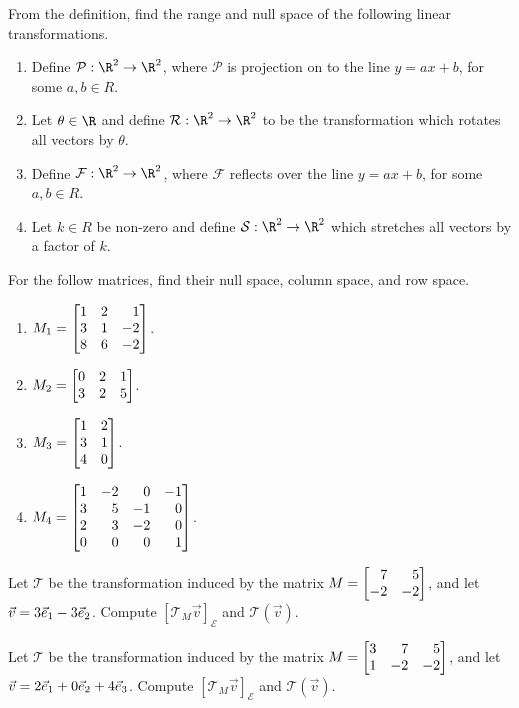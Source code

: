 \begin{exercises}
	\begin{problist}
		\prob  From the definition, find the range and null space of the following linear transformations.
		\begin{enumerate}
		    \item   Define $\mathcal P:\R^2\to\R^2$, where $\mathcal P$ is projection on to the line $y=ax+b$, for some $a,b \in R$.
			\item   Let $\theta\in \R$ and define $\mathcal R:\R^2\to\R^2$ to be the transformation which rotates all vectors by $\theta$.
			\item   Define $\mathcal F:\R^2\to\R^2$, where $\mathcal F$ reflects over the line $y=ax+b$, for some $a,b \in R$.
			\item   Let $k\in R$ be non-zero and define $\mathcal S:\R^2\to\R^2$ which stretches all vectors by a factor of $k$.
		\end{enumerate}
		
		\prob For the follow matrices, find their null space, column space, and row space.
		    \begin{enumerate}
		        \item $M_1=\mat{1&2&1\\3&1&-2\\8&6&-2}$.
		        \item $M_2=\mat{0&2&1\\3&2&5}$.
		        \item $M_3=\mat{1&2\\3&1\\4&0}$.
		        \item $M_4=\mat{1&-2&0&-1\\3&5&-1&0\\2&3&-2&0\\0&0&0&1}$.
		    \end{enumerate}
		    
		\prob Let $\mathcal T$ be the transformation induced by the matrix $M=\mat{7&5\\-2&-2}$,
	    and let $\vec v=3{\vec e_1}-3{\vec e_2}$. Compute $[\mathcal T_{M}\vec v]_{\mathcal E}$ and $\mathcal T(\vec v)$.
	    
	    \prob Let $\mathcal T$ be the transformation induced by the matrix $M=\mat{3&7&5\\1&-2&-2}$,
	    and let $\vec v=2{\vec e_1}+0{\vec e_2}+4{\vec e_3}$. Compute $[\mathcal T_{M}\vec v]_{\mathcal E}$ and $\mathcal T(\vec v)$.
		

\end{problist}
\end{exercises}
